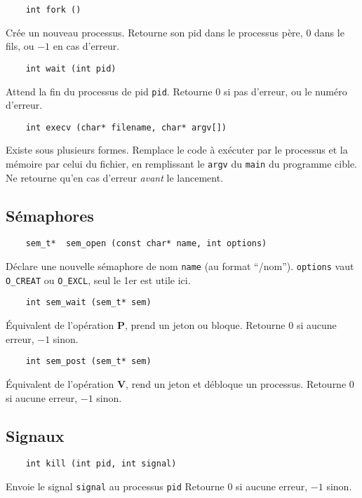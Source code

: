 \documentclass[10pt,twocolumn,a4paper]{article}
\begin{document}
\begin{lstlisting}
    int fork ()
\end{lstlisting}

Cr\'ee un nouveau processus.
Retourne son pid dans le processus p\`ere, $0$ dans le fils, ou $-1$ en cas d'erreur.

\begin{lstlisting}
    int wait (int pid)
\end{lstlisting}

Attend la fin du processus de pid \texttt{pid}.
Retourne 0 si pas d'erreur, ou le num\'ero d'erreur.

\begin{lstlisting}
    int execv (char* filename, char* argv[])
\end{lstlisting}

Existe sous plusieurs formes.
Remplace le code à exécuter par le processus et la mémoire par celui du fichier, en remplissant le \texttt{argv} du \texttt{main} du programme cible.
Ne retourne qu'en cas d'erreur \emph{avant} le lancement.

\subsection{Sémaphores}

\begin{lstlisting}
    sem_t*  sem_open (const char* name, int options)
\end{lstlisting}
Déclare une nouvelle sémaphore de nom \texttt{name} (au format ``/nom''). 
\texttt{options} vaut \texttt{O\_CREAT} ou \texttt{O\_EXCL}, seul le 1er est utile ici.


\begin{lstlisting}
    int sem_wait (sem_t* sem)
\end{lstlisting}
\'Equivalent de l'opération \textbf{P}, prend un jeton ou bloque.
Retourne $0$ si aucune erreur, $-1$ sinon.


\begin{lstlisting}
    int sem_post (sem_t* sem)
\end{lstlisting}
\'Equivalent de l'opération \textbf{V}, rend un jeton et débloque un processus.
Retourne $0$ si aucune erreur, $-1$ sinon.

\subsection{Signaux}

\begin{lstlisting}
    int kill (int pid, int signal)
\end{lstlisting}
Envoie le signal \texttt{signal} au processus \texttt{pid}
Retourne $0$ si aucune erreur, $-1$ sinon.
\end{document}
